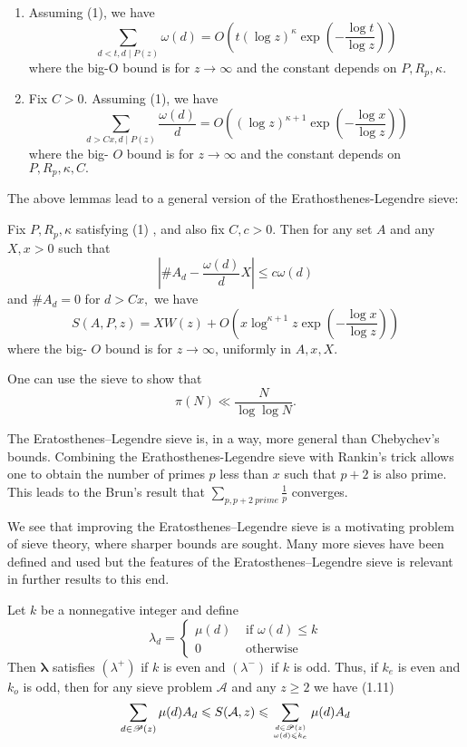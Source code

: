 \begin{lemma}
\begin{enumerate}
    \item Assuming (1), we have
$$
\sum_{d<t, d \mid P(z)} \omega(d)=O\left(t(\log z)^{\kappa} \exp \left(-\frac{\log t}{\log z}\right)\right)
$$
where the big-O bound is for $z \rightarrow \infty$ and the constant depends on $P, R_{p}, \kappa$.
    \item Fix $C>0 .$ Assuming (1), we have
$$
\sum_{d>C x, d \mid P(z)} \frac{\omega(d)}{d}=O\left((\log z)^{\kappa+1} \exp \left(-\frac{\log x}{\log z}\right)\right)
$$
where the big- $O$ bound is for $z \rightarrow \infty$ and the constant depends on $P, R_{p}, \kappa, C .$
\end{enumerate}
 
\end{lemma}

The above lemmas lead to a general version of the  Erathosthenes-Legendre sieve:

\begin{theorem}[]
Fix $P, R_{p}, \kappa$ satisfying (1) , and also fix $C, c>0$. Then for any set $A$ and any $X, x>0$ such that
$$
\left|\# A_{d}-\frac{\omega(d)}{d} X\right| \leq c \omega(d)
$$
and $\# A_{d}=0$ for $d>C x,$ we have
$$
S(A, P, z)=X W(z)+O\left(x \log ^{\kappa+1} z \exp \left(-\frac{\log x}{\log z}\right)\right)
$$
where the big- $O$ bound is for $z \rightarrow \infty$, uniformly in $A, x, X$.
\end{theorem}

One can use the sieve to show that 
$$
\pi(N) \ll \frac{N}{\log \log N}.
$$

The Eratosthenes–Legendre sieve is, in a way, more general than Chebychev’s bounds. Combining the Erathosthenes-Legendre sieve with Rankin's trick allows one to obtain the number of primes $p$ less than $x$ such that $p+2$ is also prime. This leads to the Brun's result that $\sum_{p,p+2\ prime}\frac{1}{p}$ converges.\cite{cojocarumurty}\cite{kedlaya}

We see that improving the Eratosthenes–Legendre sieve is a motivating problem of sieve theory, where sharper bounds are sought. Many more sieves have been defined and used but the features of the Eratosthenes–Legendre sieve is relevant in further results to this end.

\begin{theorem}
Let $k$ be a nonnegative integer and define
$$
\lambda_{d}=\left\{\begin{array}{ll}
\mu(d) & \text { if } \omega(d) \leqslant k \\
0 & \text { otherwise }
\end{array}\right.
$$
Then $\boldsymbol{\lambda}$ satisfies $\left(\lambda^{+}\right)$ if $k$ is even and $\left(\lambda^{-}\right)$ if $k$ is odd. Thus, if $k_{e}$ is even and $k_{o}$ is odd, then for any sieve
problem $\mathcal{A}$ and any $z \geqslant 2$ we have
(1.11)
$$
\sum_{d \in \mathscr{P}(z)} \mu(d) A_{d} \leqslant S(\mathcal{A}, z) \leqslant \sum_{d \in \mathscr{P}(z) \atop \omega(d) \leqslant k_{e}} \mu(d) A_{d}
$$
\end{theorem}